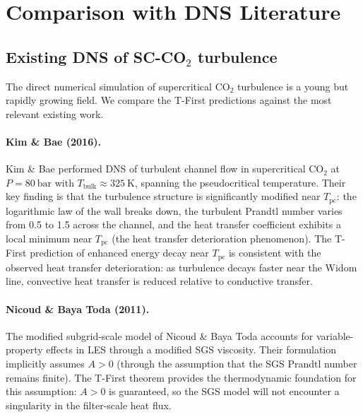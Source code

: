 \documentclass[12pt,a4paper]{article}
\newcommand{\Tc}{T_{\mathrm{pc}}}   %
\begin{document}
\section{Comparison with DNS Literature}
\label{sec:comparison}

\subsection{Existing DNS of SC-CO$_2$ turbulence}
\label{sec:comparison:existing}

The direct numerical simulation of supercritical CO$_2$ turbulence is a young
but rapidly growing field.  We compare the T-First predictions against the most
relevant existing work.

\paragraph{Kim \& Bae (2016).}
Kim \& Bae \citep{KimBae2016} performed DNS of turbulent channel flow in
supercritical CO$_2$ at $P = \SI{80}{\bar}$ with
$T_{\mathrm{bulk}} \approx \SI{325}{\kelvin}$, spanning the pseudocritical
temperature.  Their key finding is that the turbulence structure is significantly
modified near $\Tc$: the logarithmic law of the wall breaks down, the turbulent
Prandtl number varies from 0.5 to 1.5 across the channel, and the heat transfer
coefficient exhibits a local minimum near $\Tc$ (the heat transfer deterioration
phenomenon).  The T-First prediction of enhanced energy decay near $\Tc$ is
consistent with the observed heat transfer deterioration: as turbulence decays
faster near the Widom line, convective heat transfer is reduced relative to
conductive transfer.

\paragraph{Nicoud \& Baya Toda (2011).}
The modified subgrid-scale model of Nicoud \& Baya Toda \citep{Nicoud2011}
accounts for variable-property effects in LES through a modified SGS viscosity.
Their formulation implicitly assumes $A > 0$ (through the assumption that the
SGS Prandtl number remains finite).  The T-First theorem provides the
thermodynamic foundation for this assumption: $A > 0$ is guaranteed, so the
SGS model will not encounter a singularity in the filter-scale heat flux.
\end{document}
